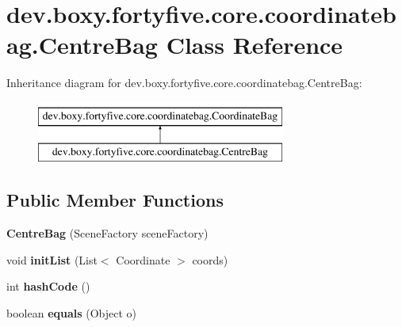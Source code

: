 \hypertarget{classdev_1_1boxy_1_1fortyfive_1_1core_1_1coordinatebag_1_1_centre_bag}{
\section{dev.boxy.fortyfive.core.coordinatebag.CentreBag Class Reference}
\label{d6/d2f/classdev_1_1boxy_1_1fortyfive_1_1core_1_1coordinatebag_1_1_centre_bag}
}
Inheritance diagram for dev.boxy.fortyfive.core.coordinatebag.CentreBag:\begin{figure}[H]
\begin{center}
\leavevmode
\includegraphics[height=2.000000cm]{d6/d2f/classdev_1_1boxy_1_1fortyfive_1_1core_1_1coordinatebag_1_1_centre_bag}
\end{center}
\end{figure}
\subsection*{Public Member Functions}
\begin{DoxyCompactItemize}
\item 
\hypertarget{classdev_1_1boxy_1_1fortyfive_1_1core_1_1coordinatebag_1_1_centre_bag_a915d7bbc72b9479778a194e43ea82d04}{
{\bfseries CentreBag} (SceneFactory sceneFactory)}
\label{d6/d2f/classdev_1_1boxy_1_1fortyfive_1_1core_1_1coordinatebag_1_1_centre_bag_a915d7bbc72b9479778a194e43ea82d04}

\item 
\hypertarget{classdev_1_1boxy_1_1fortyfive_1_1core_1_1coordinatebag_1_1_centre_bag_a5a1db60240f69b34ed69982183261009}{
void {\bfseries initList} (List$<$ Coordinate $>$ coords)}
\label{d6/d2f/classdev_1_1boxy_1_1fortyfive_1_1core_1_1coordinatebag_1_1_centre_bag_a5a1db60240f69b34ed69982183261009}

\item 
\hypertarget{classdev_1_1boxy_1_1fortyfive_1_1core_1_1coordinatebag_1_1_centre_bag_ad6cd5c7fa3b315c36bcb79c5dae2ef39}{
int {\bfseries hashCode} ()}
\label{d6/d2f/classdev_1_1boxy_1_1fortyfive_1_1core_1_1coordinatebag_1_1_centre_bag_ad6cd5c7fa3b315c36bcb79c5dae2ef39}

\item 
\hypertarget{classdev_1_1boxy_1_1fortyfive_1_1core_1_1coordinatebag_1_1_centre_bag_a48945e6ede56ab891e406d327d3068a4}{
boolean {\bfseries equals} (Object o)}
\label{d6/d2f/classdev_1_1boxy_1_1fortyfive_1_1core_1_1coordinatebag_1_1_centre_bag_a48945e6ede56ab891e406d327d3068a4}

\end{DoxyCompactItemize}
